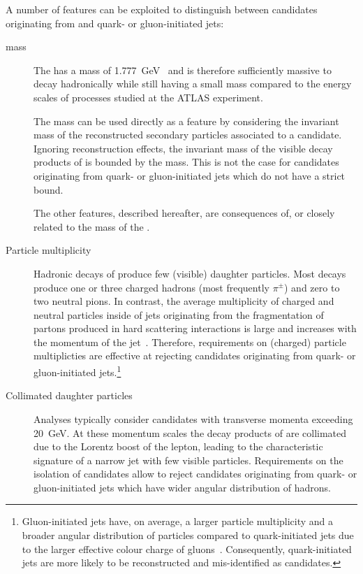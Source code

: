 A number of features can be exploited to distinguish between
\tauhadvis candidates originating from \tauhad and quark- or
gluon-initiated jets:
\begin{description}

\item[\taulepton mass] The \taulepton has a mass of
  \SI{1.777}{\GeV}~\cite{pdg2020} and is therefore sufficiently
  massive to decay hadronically while still having a small mass
  compared to the energy scales of processes studied at the ATLAS
  experiment.

  The \taulepton mass can be used directly as a feature by considering
  the invariant mass of the reconstructed secondary particles
  associated to a \tauhadvis candidate. Ignoring reconstruction
  effects, the invariant mass of the visible decay products of \tauhad
  is bounded by the \taulepton mass. This is not the case for
  \tauhadvis candidates originating from quark- or gluon-initiated
  jets which do not have a strict bound.

  The other features, described hereafter, are consequences of, or
  closely related to the mass of the \taulepton.

\item[Particle multiplicity] Hadronic decays of \tauleptons produce
  few (visible) daughter particles. Most decays produce one or three
  charged hadrons (most frequently $\pi^{\pm}$) and zero to two
  neutral pions.
  In contrast, the average multiplicity of charged and neutral
  particles inside of jets originating from the fragmentation of
  partons produced in hard scattering interactions is large and
  increases with the momentum of the
  jet~\cite{Ellis:1996mzs,STDM-2015-12}. Therefore, requirements on
  (charged) particle multiplicties are effective at rejecting
  \tauhadvis candidates originating from quark- or gluon-initiated
  jets.\footnote{Gluon-initiated jets have, on average, a larger
    particle multiplicity and a broader angular distribution of
    particles compared to quark-initiated jets due to the larger
    effective colour charge of
    gluons~\cite{Ellis:1996mzs}. Consequently, quark-initiated jets
    are more likely to be reconstructed and mis-identified as
    \tauhadvis candidates.}

\item[Collimated daughter particles] Analyses typically consider
  \tauhadvis candidates with transverse momenta exceeding
  \SI{20}{\GeV}. At these momentum scales the decay products of
  \tauleptons are collimated due to the Lorentz boost of the lepton,
  leading to the characteristic signature of a narrow jet with few
  visible particles. Requirements on the isolation of \tauhadvis
  candidates allow to reject candidates originating from quark- or
  gluon-initiated jets which have wider angular distribution of
  hadrons.


\end{description}
